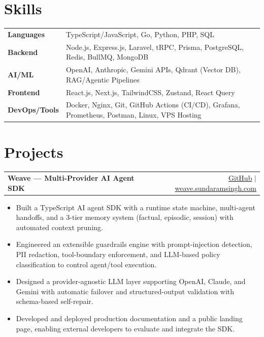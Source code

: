 \documentclass[a4paper,10pt]{article}
\makeatletter
\newenvironment{joblong}[2]
    {
    \begin{tabularx}{\linewidth}{@{}l X r@{}}
    \textbf{#1} & \hfill &  #2 \\[1pt]
    \end{tabularx}
    \begin{minipage}[t]{\linewidth}
    \begin{itemize}[nosep,after=\strut, leftmargin=1em, itemsep=0pt,topsep=0pt]
    }
    {
    \end{itemize}
    \end{minipage}    
    }
\makeatother
\begin{document}
\section{Skills}
\begin{tabularx}{\linewidth}{@{}l X@{}}
\textbf{Languages} & \normalsize{TypeScript/JavaScript, Go, Python, PHP, SQL}\\
\textbf{Backend} & \normalsize{Node.js, Express.js, Laravel, tRPC, Prisma, PostgreSQL, Redis, BullMQ, MongoDB}\\
\textbf{AI/ML} & \normalsize{OpenAI, Anthropic, Gemini APIs, Qdrant (Vector DB), RAG/Agentic Pipelines}\\
\textbf{Frontend} & \normalsize{React.js, Next.js, TailwindCSS, Zustand, React Query}\\
\textbf{DevOps/Tools} & \normalsize{Docker, Nginx, Git, GitHub Actions (CI/CD), Grafana, Prometheus, Postman, Linux, VPS Hosting}\\
\end{tabularx}

\section{Projects}

\begin{joblong}{Weave — Multi-Provider AI Agent SDK}{\href{https://github.com/sundaram26/AgentSdk}{GitHub} $|$ \href{https://weave.sundaramsingh.com}{weave.sundaramsingh.com}}
\item Built a TypeScript AI agent SDK with a runtime state machine, multi-agent handoffs, and a 3-tier memory system (factual, episodic, session) with automated context pruning.
\item Engineered an extensible guardrails engine with prompt-injection detection, PII redaction, tool-boundary enforcement, and LLM-based policy classification to control agent/tool execution.
\item Designed a provider-agnostic LLM layer supporting OpenAI, Claude, and Gemini with automatic failover and structured-output validation with schema-based self-repair.
\item Developed and deployed production documentation and a public landing page, enabling external developers to evaluate and integrate the SDK.
\end{joblong}
\end{document}
